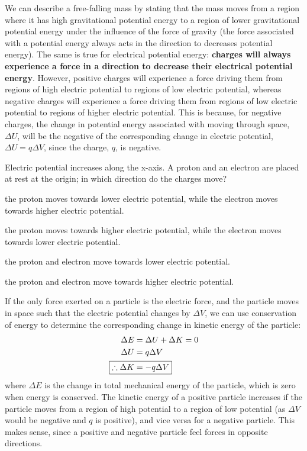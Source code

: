 We can describe a free-falling mass by stating that the mass moves from a region where it has high gravitational potential energy to a region of lower gravitational potential energy under the influence of the force of gravity (the force associated with a potential energy always acts in the direction to decreases potential energy). The same is true for electrical potential energy: \textbf{charges will always experience a force in a direction to decrease their electrical potential energy}. However, positive charges will experience a force driving them from regions of high electric potential to regions of low electric potential, whereas negative charges will experience a force driving them from regions of low electric potential to regions of higher electric potential. This is because, for negative charges, the change in potential energy associated with moving through space, $\Delta U$, will be the negative of the corresponding change in electric potential, $\Delta U=q\Delta V$, since the charge, $q$, is negative. 

\begin{checkpoint}
	\begin{MCquestion}{Electric potential increases along the x-axis. A proton and an electron are placed at rest at the origin; in which direction do the charges move?}
		\item the proton moves towards lower electric potential, while the electron moves towards higher electric potential. \correct
		\item the proton moves towards higher electric potential, while the electron moves towards lower electric potential.
		\item the proton and electron move towards lower electric potential.
		\item the proton and electron move towards higher electric potential.
	\end{MCquestion}
\end{checkpoint}

If the only force exerted on a particle is the electric force, and the particle moves in space such that the electric potential changes by $\Delta V$, we can use conservation of energy to determine the corresponding change in kinetic energy of the particle:
\begin{align*}
\Delta E &= \Delta U + \Delta K = 0\\
\Delta U &= q\Delta V\\
\Aboxed{\therefore \Delta K &= -q \Delta V}
\end{align*}
where $\Delta E$ is the change in total mechanical energy of the particle, which is zero when energy is conserved. The kinetic energy of a positive particle increases if the particle moves from a region of high potential to a region of low potential (as $\Delta V$ would be negative and $q$ is positive), and vice versa for a negative particle. This makes sense, since a positive and negative particle feel forces in opposite directions.

